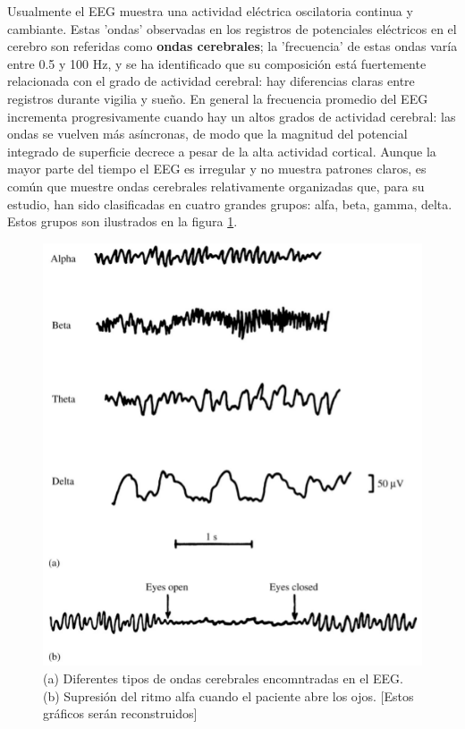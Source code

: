 \documentclass[12pt,a4paper]{mitthesis}
\begin{document}
Usualmente el EEG muestra una actividad el\'ectrica oscilatoria continua y cambiante.%
Estas 'ondas' observadas en los registros de potenciales el\'ectricos en el cerebro son referidas 
como \textbf{ondas cerebrales}; la 'frecuencia' de estas ondas var\'ia entre 0.5 y 100 Hz, y se ha 
identificado que su composici\'on est\'a fuertemente relacionada con el grado de actividad 
cerebral: hay diferencias claras entre registros durante vigilia y sue\~no.
En general la frecuencia promedio del EEG incrementa progresivamente cuando hay un altos grados 
de actividad cerebral: las ondas se vuelven m\'as as\'incronas, de modo que la magnitud del 
potencial integrado de superficie decrece a pesar de la alta actividad cortical.
Aunque la mayor parte del tiempo el EEG es irregular y no muestra patrones claros, es com\'un que 
muestre ondas cerebrales relativamente organizadas que, para su estudio, han sido clasificadas en 
cuatro grandes grupos: alfa, beta, gamma, delta.
Estos grupos son ilustrados en la figura \ref{ritmos}.

\begin{figure}
\centering
\includegraphics[width=0.5\linewidth]{figura_4.png} 
\caption{(a) Diferentes tipos de ondas cerebrales encomntradas en el EEG. (b) Supresi\'on del 
ritmo alfa cuando el paciente abre los ojos.
[Estos gr\'aficos ser\'an reconstruidos]
}
\label{ritmos}
\end{figure}
\end{document}
